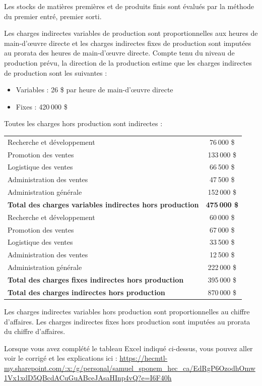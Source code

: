 \documentclass[oneside]{kaobook}
\begin{document}
Les stocks de matières premières et de produits finis sont évalués par la méthode du premier entré, premier sorti.

Les charges indirectes variables de production sont proportionnelles aux heures de main-d’œuvre directe et les charges indirectes fixes de production sont imputées au prorata des heures de main-d’œuvre directe. Compte tenu du niveau de production prévu, la direction de la production estime que les charges indirectes de production sont les suivantes :
\begin{itemize}
\item Variables : 26 \$ par heure de main-d’œuvre directe
\item Fixes : 420 000 \$
\end{itemize}

Toutes les charges hors production sont indirectes :
\begin{center}
\footnotesize
\begin{tabular}{l c}
Recherche et développement & 76 000 \$\\
Promotion des ventes & 133 000 \$\\
Logistique des ventes & 66 500 \$\\
Administration des ventes & 47 500 \$\\
Administration générale & 152 000 \$\\
\textbf{Total des charges variables indirectes hors production} & \textbf{475 000 \$}\\
Recherche et développement & 60 000 \$\\
Promotion des ventes & 67 000 \$\\
Logistique des ventes & 33 500 \$\\
Administration des ventes & 12 500 \$\\
Administration générale & 222 000 \$\\
\textbf{Total des charges fixes indirectes hors production} & 395 000 \$\\
\textbf{Total des charges indirectes hors production} & 870 000 \$\\
\end{tabular}
\end{center}
Les charges indirectes variables hors production sont proportionnelles au chiffre d’affaires. Les charges indirectes fixes hors production sont imputées au prorata du chiffre d’affaires.

\begin{kaobox}
Lorsque vous avez complété le tableau Excel indiqué ci-dessus, vous pouvez aller voir le corrigé et les explications ici : \url{https://hecmtl-my.sharepoint.com/:x:/g/personal/samuel\_sponem\_hec\_ca/EdRgP6OzodhOmw1Vx1xdD5QBcdACuGuABceJAsaHInp4vQ?e=I6F40h}
\end{kaobox}
\end{document}
